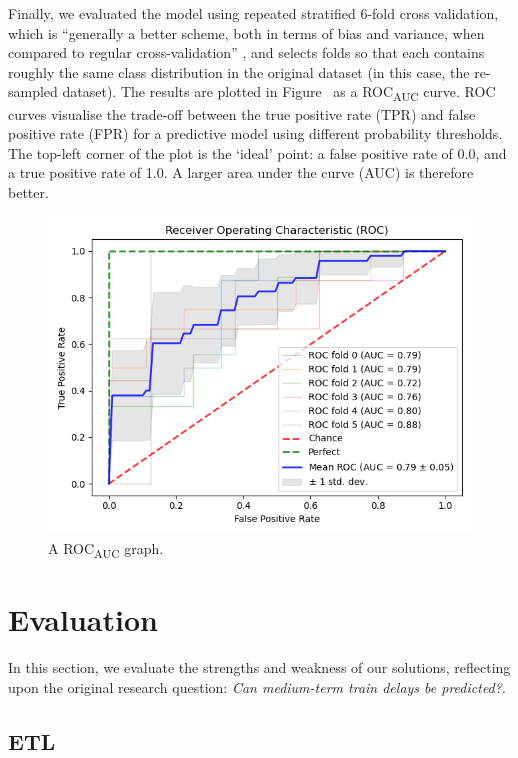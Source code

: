 \documentclass[12pt,a4paper]{article}
\begin{document}
Finally, we evaluated the model using repeated stratified $6$-fold cross validation, which is “generally a better scheme, both in terms of bias and variance, when compared to regular cross-validation” \cite{kohavi_1995}, and selects folds so that each contains roughly the same class distribution in the original dataset (in this case, the re-sampled dataset). The results are plotted in Figure~\cite{fig:roc} as a ROC\textsubscript{AUC} curve. ROC curves visualise the trade-off between the true positive rate (TPR) and false positive rate (FPR) for a predictive model using different probability thresholds. The top-left corner of the plot is the ‘ideal’ point: a false positive rate of 0.0, and a true positive rate of 1.0. A larger area under the curve (AUC) is therefore better.

\begin{figure}[h!]
  \includegraphics[width=\linewidth]{images/roc_auc.png}
  \caption{A ROC\textsubscript{AUC} graph.}
  \label{fig:roc}
\end{figure}

\clearpage
\section{Evaluation}

In this section, we evaluate the strengths and weakness of our solutions, reflecting upon the original research question: \textit{Can medium-term train delays be predicted?}.

\subsection{ETL}
\end{document}
